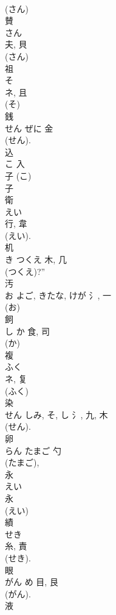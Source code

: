 \documentclass[8pt]{extreport}
\begin{document}
\begin{CJK}{UTF8}{min}
\\	(さん) 
\\	賛	
\\	さん	
\\	夫, 貝	
\\	(さん) 
\\	祖	
\\	そ	
\\	ネ, 且	
\\	(そ) 
\\	銭	
\\	せん	ぜに	金		
\\	(せん). 
\\	込	
\\	こ	入		
\\	子 (こ) 
\\	子 
\\	衛	
\\	えい	
\\	行, 韋	
\\	(えい). 
\\	机	
\\	き	つくえ	木, 几	
\\	(つくえ)?” 
\\	汚	
\\	お	よご, きたな, けが	氵, 一		
\\	(お) 
\\	飼	
\\	し	か	食, 司	
\\	(か) 
\\	複	
\\	ふく	
\\	ネ, 复	
\\	(ふく) 
\\	染	
\\	せん	しみ, そ, し	氵, 九, 木	
\\	(せん). 
\\	卵	
\\	らん	たまご	勺	
\\	(たまご), 
\\	永	
\\	えい	
\\	永	
\\	(えい) 
\\	績	
\\	せき	
\\	糸, 責	
\\	(せき). 
\\	眼	
\\	がん	め	目, 艮	
\\	(がん). 
\\	液	

\end{CJK}
\end{document}
